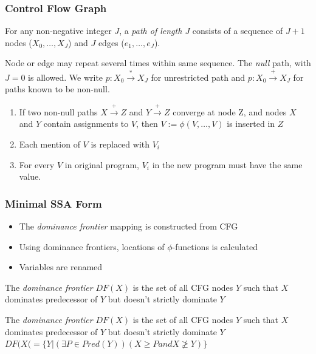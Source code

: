 \documentclass{beamer}
\begin{document}
  \begin{frame}
    \frametitle{Control Flow Graph}
    \begin{definition}
    	For any non-negative integer $J$, a \emph{path of length $J$}
    	consists of a sequence of $J + 1$ nodes ($X_0,\ldots,X_J$) 
    	and $J$ edges ($e_1,\ldots,e_J$).
    \end{definition}
    
    Node or edge may repeat several times within same sequence. 
    The \emph{null} path, with $J = 0$ is allowed. 
    We write 
    	$p: X_0\overset{\ast}{\rightarrow}X_J$ 
    for unrestricted path and 
    	$p: X_0\overset{+}{\rightarrow}X_J$
    for paths known to be non-null.
    
	\begin{enumerate}
	    \item If two non-null paths 
	    	$X\overset{+}{\rightarrow}Z$ and $Y\overset{+}{\rightarrow}Z$ 
	    	converge at node Z, 
	    	and nodes $X$ and $Y$ contain assignments to $V$,
	    	then $V := \phi(V,\ldots,V)$ is inserted in $Z$
	    \item Each mention of $V$ is replaced with $V_i$
	    \item For every $V$ in original program, $V_i$ in the new program must have the same value.
	\end{enumerate}    
    
  \end{frame}

  \begin{frame}
  	\frametitle{Minimal SSA Form}
  	\begin{itemize}
    	\item The \emph{dominance frontier} mapping is constructed from CFG
    	\item Using dominance frontiers, locations of $\phi$-functions is calculated
    	\item Variables are renamed
    \end{itemize}
    
	\begin{definition}
    	The \emph{dominance frontier} $DF(X)$ is the set of all CFG nodes $Y$
    	such that $X$ dominates predecessor of $Y$ 
    	but doesn't strictly dominate $Y$
    \end{definition}    
    
    \begin{definition}
    	The \emph{dominance frontier} $DF(X)$ is the set of all CFG nodes $Y$
    	such that $X$ dominates predecessor of $Y$ 
    	but doesn't strictly dominate $Y$ \\
    	$DF(X( = \lbrace Y | (\exists P \in Pred(Y)) (X \geqslant P{} and{} X \ngeqslant Y)\rbrace$
    \end{definition}
  \end{frame}
\end{document}
